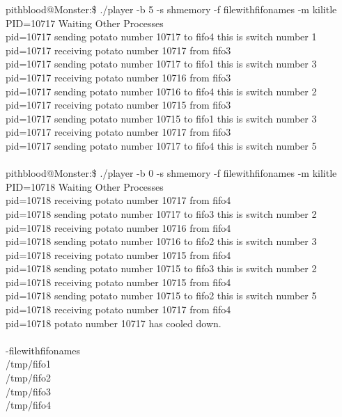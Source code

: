 \documentclass{article}
\begin{document}
pithblood@Monster:\$ ./player -b 5 -s shmemory -f filewithfifonames -m kilitle\\
PID=10717 Waiting Other Processes\\
pid=10717 sending potato number 10717 to fifo4 this is switch number 1\\
pid=10717 receiving potato number 10717 from fifo3\\
pid=10717 sending potato number 10717 to fifo1 this is switch number 3\\
pid=10717 receiving potato number 10716 from fifo3\\
pid=10717 sending potato number 10716 to fifo4 this is switch number 2\\
pid=10717 receiving potato number 10715 from fifo3\\
pid=10717 sending potato number 10715 to fifo1 this is switch number 3\\
pid=10717 receiving potato number 10717 from fifo3\\
pid=10717 sending potato number 10717 to fifo4 this is switch number 5\\\\

pithblood@Monster:\$ ./player -b 0 -s shmemory -f filewithfifonames -m kilitle\\
PID=10718 Waiting Other Processes\\
pid=10718 receiving potato number 10717 from fifo4\\
pid=10718 sending potato number 10717 to fifo3 this is switch number 2\\
pid=10718 receiving potato number 10716 from fifo4\\
pid=10718 sending potato number 10716 to fifo2 this is switch number 3\\
pid=10718 receiving potato number 10715 from fifo4\\
pid=10718 sending potato number 10715 to fifo3 this is switch number 2\\
pid=10718 receiving potato number 10715 from fifo4\\
pid=10718 sending potato number 10715 to fifo2 this is switch number 5\\
pid=10718 receiving potato number 10717 from fifo4\\
pid=10718 potato number 10717 has cooled down.\\\\

-filewithfifonames\\
/tmp/fifo1\\
/tmp/fifo2\\
/tmp/fifo3\\
/tmp/fifo4\\
\end{document}
